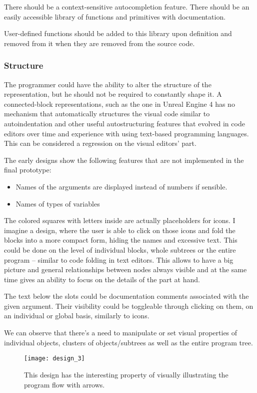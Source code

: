 There should be a context-sensitive autocompletion feature. There should be an easily accessible library of functions and primitives with documentation.

User-defined functions should be added to this library upon definition and removed from it when they are removed from the source code.

\subsubsection{Structure}
The programmer could have the ability to alter the structure of the
representation, but he should not be required to constantly shape it. A
connected-block representations, such as the one in Unreal Engine 4 has no
mechanism that automatically structures the visual code similar to
autoindentation and other useful autostructuring features that evolved in code
editors over time and experience with using text-based programming
languages. This can be considered a regression on the visual editors' part.

The early designs show the following features that are not implemented in the
final prototype:
\begin{itemize}
	\item Names of the arguments are displayed instead of numbers if
          sensible.
	\item Names of types of variables
\end{itemize}

The colored squares with letters inside are actually placeholders for icons.  I
imagine a design, where the user is able to click on those icons and fold the
blocks into a more compact form, hiding the names and excessive text. This could
be done on the level of individual blocks, whole subtrees or the entire program
-- similar to code folding in text editors. This allows to have a big picture
and general relationships between nodes always visible and at the same time
gives an ability to focus on the details of the part at hand.

The text below the slots could be documentation comments associated with the
given argument. Their visibility could be toggleable through clicking on them,
on an individual or global basis, similarly to icons.

We can observe that there's a need to manipulate or set visual properties of
individual objects, clusters of objects/subtrees as well as the entire program
tree.


\begin{figure}[h!]
\centering \texttt{[image: design\_3]}
\caption{This design has the interesting property of visually illustrating the
  program flow with arrows.}
\label{fig:design_3}
\end{figure}


